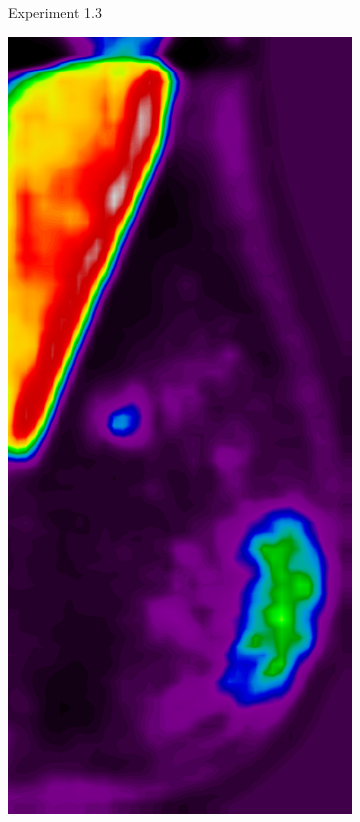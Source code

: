 \begin{figure}[h!]
\begin{subfigure}{0.195\textwidth}
		\caption{Experiment 1.3}
    \end{subfigure}
	\begin{subfigure}{0.195\textwidth}
		\centering
			\includegraphics[width=\textwidth]{plots/examples/example4_probs_2.png}

\end{subfigure}
\end{figure}
